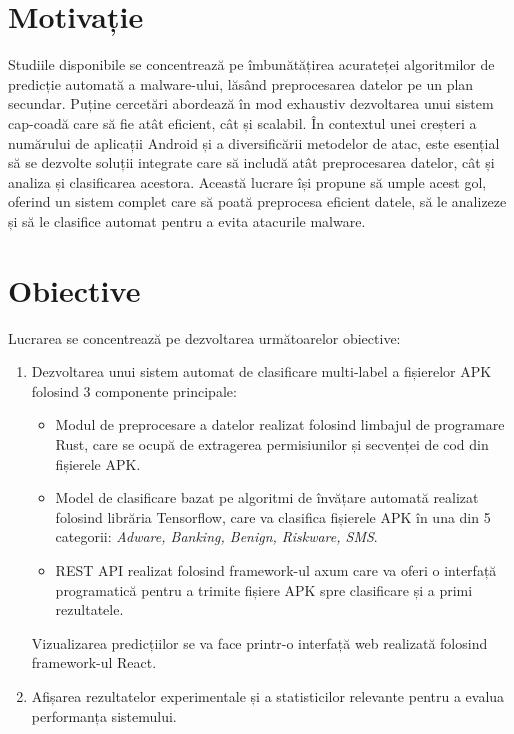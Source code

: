 \documentclass[12pt,a4paper]{report}
\begin{document}
\section{Motivație}
Studiile disponibile se concentrează pe îmbunătățirea acurateței algoritmilor 
de predicție automată a malware-ului, lăsând preprocesarea datelor pe un plan secundar. 
Puține cercetări abordează în mod exhaustiv dezvoltarea unui sistem cap-coadă care să fie
atât eficient, cât și scalabil. În contextul unei creșteri a numărului de aplicații 
Android și a diversificării metodelor de atac, este esențial să se dezvolte soluții integrate 
care să includă atât preprocesarea datelor, cât și analiza și clasificarea acestora. 
Această lucrare își propune să umple acest gol, oferind un sistem complet care să poată 
preprocesa eficient datele, să le analizeze și să le clasifice automat pentru a 
evita atacurile malware.
\section{Obiective}
Lucrarea se concentrează pe dezvoltarea următoarelor obiective:
\begin{enumerate}
    \item Dezvoltarea unui sistem automat de clasificare multi-label a fișierelor APK\cite{apk-file-format-wiki} folosind 3 componente principale:
    \begin{itemize}
        \item Modul de preprocesare a datelor realizat folosind limbajul de programare Rust\cite{rustlang}, care se ocupă de extragerea permisiunilor și secvenței de cod din fișierele APK.
        \item Model de clasificare bazat pe algoritmi de învățare automată realizat folosind librăria Tensorflow\cite{tensorflow}, care va clasifica fișierele APK în una din 5 categorii: \textit{Adware, Banking, Benign, Riskware, SMS}.
        \item REST API realizat folosind framework-ul axum\cite{axum-framework} care va oferi o interfață programatică pentru a trimite fișiere APK spre clasificare și a primi rezultatele.
    \end{itemize}
    Vizualizarea predicțiilor se va face printr-o interfață web realizată folosind framework-ul React\cite{react}.
    \item Afișarea rezultatelor experimentale și a statisticilor relevante pentru a evalua performanța sistemului.
\end{enumerate}
\end{document}
